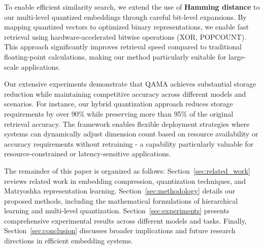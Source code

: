 To enable efficient similarity search, we extend the use of \textbf{Hamming distance} to our multi-level quantized embeddings through careful bit-level expansions. 
By mapping quantized vectors to optimized binary representations, we enable fast retrieval using hardware-accelerated bitwise operations (XOR, POPCOUNT). This approach significantly improves retrieval speed compared to traditional floating-point calculations, making our method particularly suitable for large-scale applications.

Our extensive experiments demonstrate that QAMA achieves substantial storage reduction while maintaining competitive accuracy across different models and scenarios. For instance, our hybrid quantization approach reduces storage requirements by over 90\% while preserving more than 95\% of the original retrieval accuracy. The framework enables flexible deployment strategies where systems can dynamically adjust dimension count based on resource availability or accuracy requirements without retraining - a capability particularly valuable for resource-constrained or latency-sensitive applications.

The remainder of this paper is organized as follows: Section~\ref{sec:related_work} reviews related work in embedding compression, quantization techniques, and Matryoshka representation learning. Section~\ref{sec:methodology} details our proposed methods, including the mathematical formulations of hierarchical learning and multi-level quantization. Section~\ref{sec:experiments} presents comprehensive experimental results across different models and tasks. 
Finally, Section~\ref{sec:conclusion} discusses broader implications and future research directions in efficient embedding systems.
